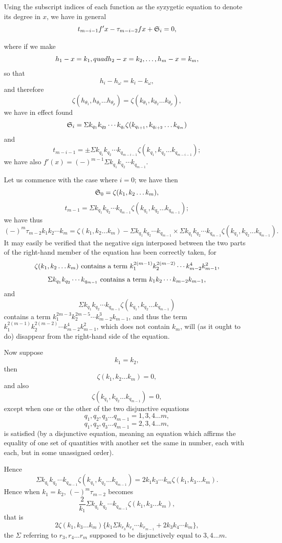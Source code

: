 \documentclass[11pt]{article}
\newcommand{\sourcepage}[1]{\marginpar{\scriptsize p.~#1}}
\begin{document}
Using the subscript indices of each function as the syzygetic equation to denote its degree in $x$, we have in general
\[
t_{m-i-1}f'x-\tau_{m-i-2}fx+\mathfrak{S}_i=0,
\]

\sourcepage{487}
where if we make
\[
h_1-x=k_1,\\quad h_2-x=k_2,\ldots,h_m-x=k_m,
\]
so that
\[
h_i-h_\omega=k_i-k_\omega,
\]
and therefore
\[
\zeta(h_{\theta_1},h_{\theta_2}\ldots h_{\theta_\rho})=
\zeta(k_{\theta_1},k_{\theta_2}\ldots k_{\theta_\rho}),
\]
we have in effect found
\[
\mathfrak{S}_i=\Sigma k_{q_1}k_{q_2}\cdots k_{q_i}\zeta(k_{q_{i+1}},k_{q_{i+2}}\ldots k_{q_m})
\]
and
\[
t_{m-i-1}=\pm\Sigma k_{q_1}k_{q_2}\cdots k_{q_{m-i-1}}\zeta(k_{q_1},k_{q_2}\ldots k_{q_{m-i-1}});
\]
we have also $f'(x)=(-)^{m-1}\Sigma k_{q_1}k_{q_2}\cdots k_{q_{m-1}}$.

Let us commence with the case where $i=0$; we have then
\[
\mathfrak{S}_0=\zeta(k_1,k_2\ldots k_m),
\]
\[
t_{m-1}=\Sigma k_{q_1}k_{q_2}\cdots k_{q_{m-1}}\zeta(k_{q_1},k_{q_2}\ldots k_{q_{m-1}});
\]
we have thus
\[
(-)^m\tau_{m-2}k_1k_2\cdots k_m=
\zeta(k_1,k_2\ldots k_m)-
\Sigma k_{q_1}k_{q_2}\cdots k_{q_{m-1}}\times
\Sigma k_{q_1}k_{q_2}\cdots k_{q_{m-1}}\zeta(k_{q_1},k_{q_2}\ldots k_{q_{m-1}}).
\]
It may easily be verified that the negative sign interposed between the two parts of the right-hand member of the equation has been correctly taken, for
\[
\zeta(k_1,k_2\ldots k_m)\hbox{ contains a term }k_1^{2(m-1)}k_2^{2(m-2)}\cdots k_{m-2}^4k_{m-1}^2,
\]
\[
\Sigma k_{q_1}k_{q_2}\cdots k_{q_{m-1}}\hbox{ contains a term }k_1k_2\cdots k_{m-2}k_{m-1},
\]
and
\[
\Sigma k_{q_1}k_{q_2}\cdots k_{q_{m-1}}\zeta(k_{q_1},k_{q_2}\ldots k_{q_{m-1}})
\]
contains a term $k_1^{2m-3}k_2^{2m-5}\cdots k_{m-2}^3k_{m-1}$, and thus the term $k_1^{2(m-1)}k_2^{2(m-2)}\cdots k_{m-2}^4k_{m-1}^2$, which does not contain $k_m$, will (as it ought to do) disappear from the right-hand side of the equation.

Now suppose
\[
k_1=k_2,
\]
then
\[
\zeta(k_1,k_2\ldots k_m)=0,
\]
and also
\[
\zeta(k_{q_1},k_{q_2}\ldots k_{q_{m-1}})=0,
\]
except when one or the other of the two disjunctive equations
\[
q_1,q_2,q_3\ldots q_{m-1}=1,3,4\ldots m,
\]
\[
q_1,q_2,q_3\ldots q_{m-1}=2,3,4\ldots m,
\]
is satisfied (by a disjunctive equation, meaning an equation which affirms the equality of one set of quantities with another set the same in number, each with each, but in some unassigned order).

\sourcepage{488}
Hence
\[
\Sigma k_{q_1}k_{q_2}\cdots k_{q_{m-1}}\zeta(k_{q_1},k_{q_2}\ldots k_{q_{m-1}})
=2k_1k_3\cdots k_m\zeta(k_1,k_3\ldots k_m).
\]
Hence when $k_1=k_2$, $(-)^m\tau_{m-2}$ becomes
\[
\frac{2}{k_1}\Sigma k_{q_1}k_{q_2}\cdots k_{q_{m-1}}\zeta(k_1,k_3\ldots k_m),
\]
that is
\[
2\zeta(k_1,k_3\ldots k_m)\{k_1\Sigma k_{r_3}k_{r_4}\cdots k_{r_{m-1}}+2k_3k_4\cdots k_m\},
\]
the $\Sigma$ referring to $r_3,r_4\ldots r_m$ supposed to be disjunctively equal to $3,4\ldots m$.
\end{document}

